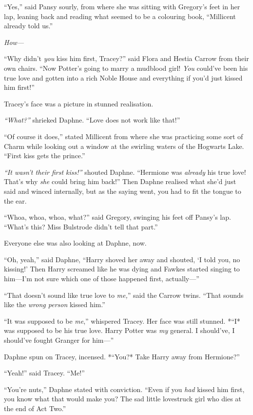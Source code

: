 ``Yes,'' said Pansy sourly, from where she was sitting with Gregory's
feet in her lap, leaning back and reading what seemed to be a colouring
book, ``Millicent already told us.''

\emph{How---}

``Why didn't \emph{you} kiss him first, Tracey?'' said Flora and Hestia
Carrow from their own chairs. ``Now Potter's going to marry a mudblood
girl! \emph{You} could've been his true love and gotten into a rich
Noble House and everything if you'd just kissed him first!''

Tracey's face was a picture in stunned realisation.

\emph{``What?''} shrieked Daphne. ``Love does not work like that!''

``Of course it does,'' stated Millicent from where she was practicing
some sort of Charm while looking out a window at the swirling waters of
the Hogwarts Lake. ``First kiss gets the prince.''

\emph{``It wasn't their first kiss!''} shouted Daphne. ``Hermione was
\emph{already} his true love! That's why \emph{she} could bring him
back!'' Then Daphne realised what she'd just said and winced internally,
but as the saying went, you had to fit the tongue to the ear.

``Whoa, whoa, whoa, what?'' said Gregory, swinging his feet off Pansy's
lap. ``What's this? Miss Bulstrode didn't tell that part.''

Everyone else was also looking at Daphne, now.

``Oh, yeah,'' said Daphne, ``Harry shoved her away and shouted, `I told
you, no kissing!' Then Harry screamed like he was dying and Fawkes
started singing to him---I'm not sure which one of those happened first,
actually---''

``That doesn't sound like true love to \emph{me,}'' said the Carrow
twins. ``That sounds like the \emph{wrong person} kissed him.''

``It was supposed to be \emph{me},'' whispered Tracey. Her face was
still stunned. *``I* was supposed to be his true love. Harry Potter was
\emph{my} general. I should've, I should've fought Granger for him---''

Daphne spun on Tracey, incensed. *``You?* Take Harry away from
Hermione?''

``Yeah!'' said Tracey. ``Me!''

``You're nuts,'' Daphne stated with conviction. ``Even if you \emph{had}
kissed him first, you know what that would make you? The sad little
lovestruck girl who dies at the end of Act Two.''

